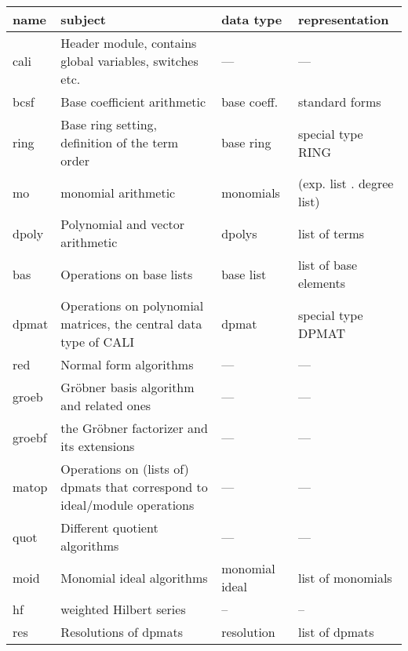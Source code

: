 \begin{tabular}{|p{1.5cm}||p{5.5cm}|p{2cm}|p{4cm}|}
\hline
\sloppy

name & subject & data type & representation \\
\hline

cali & Header module, contains \linebreak 
global variables, switches etc. & --- & ---\\

bcsf & Base coefficient arithmetic & base coeff. & standard forms \\ 

ring & Base ring setting, definition of the term order & base ring &
special type RING\\

mo & monomial arithmetic & monomials & (exp. list . degree list)\\

dpoly & Polynomial and vector arith\-metic & dpolys & list of terms\\

bas & Operations on base lists & base list & list of base elements \\

dpmat & Operations on polynomial matrices, the central data type of
CALI & dpmat & special type DPMAT\\

red & Normal form algorithms & --- & ---\\

groeb & Gr\"obner basis algorithm and related ones & --- & ---\\

groebf & the Gr\"obner factorizer and its extensions  & --- & ---\\

matop & Operations on (lists of) \linebreak dpmats that correspond to
ideal/module operations & --- & ---\\

quot & Different quotient algorithms & --- & --- \\

moid & Monomial ideal algorithms & monomial ideal & list of monomials \\

hf & weighted Hilbert series & -- & -- \\

res & Resolutions of dpmats & resolution & list of dpmats \\


\end{tabular}
